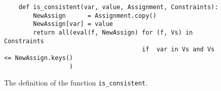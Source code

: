 \begin{figure}[!ht]
\centering
\begin{verbatim}
    def is_consistent(var, value, Assignment, Constraints):
        NewAssign      = Assignment.copy()
        NewAssign[var] = value
        return all(eval(f, NewAssign) for (f, Vs) in Constraints
                                      if  var in Vs and Vs <= NewAssign.keys()
                  )
\end{verbatim}
\vspace*{-0.3cm}
\caption{The definition of the function \texttt{is\_consistent}.}
\label{fig:is_consistent.py}
\end{figure}

